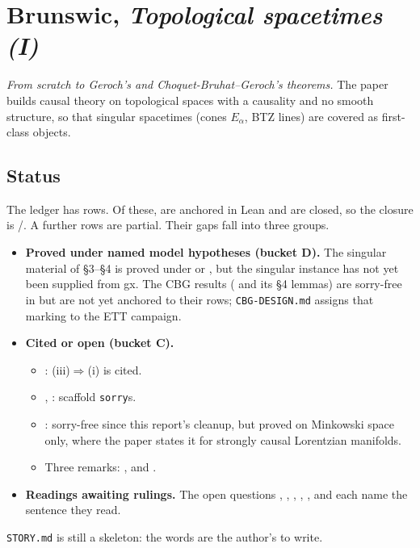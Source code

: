 \section{Brunswic, \emph{Topological spacetimes (I)}}\label{sec:ett}

\emph{From scratch to Geroch's and Choquet-Bruhat--Geroch's theorems.} The paper builds causal
theory on topological spaces with a causality and no smooth structure, so that singular
spacetimes (cones $E_\alpha$, BTZ lines) are covered as first-class objects.

\subsection{Status}

The ledger has \numEttStatements{} rows. Of these, \numEttStated{} are anchored in Lean and
\numEttClosed{} are closed, so the closure is \numEttClosed/\numEttTarget. A further
\numEttPartial{} rows are partial. Their gaps fall into three groups.
\begin{itemize}
\item \textbf{Proved under named model hypotheses (bucket D).} The singular material of §3--§4
  is proved under  or , but the singular instance has
  not yet been supplied from gx. The CBG results ( and its §4 lemmas) are
  sorry-free in  but are not yet anchored to their rows; \texttt{CBG-DESIGN.md}
  assigns that marking to the ETT campaign.
\item \textbf{Cited or open (bucket C).}
  \begin{itemize}
  \item {}: (iii)$\Rightarrow$(i) is cited.
  \item {}, : scaffold \texttt{sorry}s.
  \item {}: sorry-free since this report's cleanup, but proved
    on Minkowski space only, where the paper states it for strongly causal Lorentzian manifolds.
  \item Three remarks: ,  and
    .
  \end{itemize}
\item \textbf{Readings awaiting rulings.} The open questions , , ,
  , ,  and  each name the sentence they read.
\end{itemize}
\texttt{STORY.md} is still a skeleton: the words are the author's to write.

